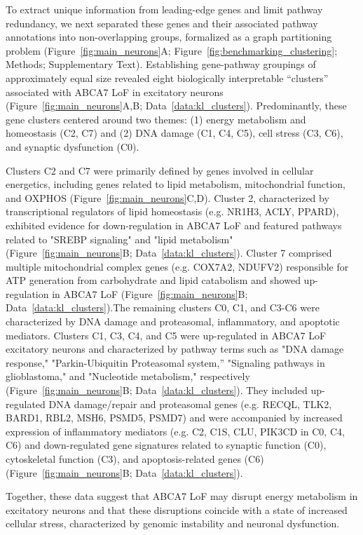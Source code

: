 To extract unique information from leading-edge genes and limit pathway redundancy, we next separated these genes and their associated pathway annotations into non-overlapping groups, formalized as a graph partitioning problem (Figure~\ref{fig:main_neurons}A; Figure~\ref{fig:benchmarking_clustering}; Methods; Supplementary Text). Establishing gene-pathway groupings of approximately equal size revealed eight biologically interpretable “clusters” associated with ABCA7 LoF in excitatory neurons (Figure~\ref{fig:main_neurons}A,B; Data~\ref{data:kl_clusters}). Predominantly, these gene clusters centered around two themes: (1) energy metabolism and homeostasis (C2, C7) and (2) DNA damage (C1, C4, C5), cell stress (C3, C6), and synaptic dysfunction (C0).

Clusters C2 and C7 were primarily defined by genes involved in cellular energetics, including genes related to lipid metabolism, mitochondrial function, and  OXPHOS (Figure~\ref{fig:main_neurons}C,D). Cluster 2, characterized by transcriptional regulators of lipid homeostasis (e.g. NR1H3, ACLY, PPARD), exhibited evidence for down-regulation in ABCA7 LoF and featured pathways related to "SREBP signaling" and "lipid metabolism" (Figure~\ref{fig:main_neurons}B; Data~\ref{data:kl_clusters}). Cluster 7 comprised multiple mitochondrial complex genes (e.g. COX7A2, NDUFV2) responsible for ATP generation from carbohydrate and lipid catabolism and showed up-regulation in ABCA7 LoF (Figure~\ref{fig:main_neurons}B; Data~\ref{data:kl_clusters}).The remaining clusters C0, C1, and C3-C6 were characterized by DNA damage and proteasomal, inflammatory, and apoptotic mediators. Clusters C1, C3, C4, and C5 were up-regulated in ABCA7 LoF excitatory neurons and characterized by pathway terms such as "DNA damage response," "Parkin-Ubiquitin Proteasomal system,” "Signaling pathways in glioblastoma," and "Nucleotide metabolism," respectively (Figure~\ref{fig:main_neurons}B; Data~\ref{data:kl_clusters}). They included up-regulated DNA damage/repair and proteasomal genes (e.g. RECQL, TLK2, BARD1, RBL2, MSH6, PSMD5, PSMD7) and were accompanied by increased expression of inflammatory mediators (e.g. C2, C1S, CLU, PIK3CD in C0, C4, C6) and down-regulated gene signatures related to synaptic function (C0), cytoskeletal function (C3), and apoptosis-related genes (C6) (Figure~\ref{fig:main_neurons}B; Data~\ref{data:kl_clusters}). 

Together, these data suggest that ABCA7 LoF may disrupt energy metabolism in excitatory neurons and that these disruptions coincide with a state of increased cellular stress, characterized by genomic instability and neuronal dysfunction.

